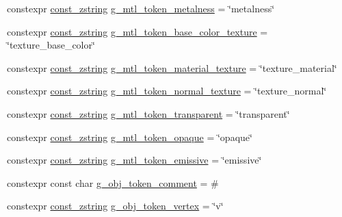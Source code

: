 \begin{DoxyCompactItemize}
\item 
constexpr \hyperlink{namespacemage_abfd9206dc607ceb5d13ec68bf075a5c0}{const\+\_\+zstring} \hyperlink{namespacemage_1_1rendering_1_1loader_a17bfd9071437318629c792d38ca71808}{g\+\_\+mtl\+\_\+token\+\_\+metalness} = \char`\"{}metalness\char`\"{}
\item 
constexpr \hyperlink{namespacemage_abfd9206dc607ceb5d13ec68bf075a5c0}{const\+\_\+zstring} \hyperlink{namespacemage_1_1rendering_1_1loader_aa3dfb00f93883473d1ff397f0079364e}{g\+\_\+mtl\+\_\+token\+\_\+base\+\_\+color\+\_\+texture} = \char`\"{}texture\+\_\+base\+\_\+color\char`\"{}
\item 
constexpr \hyperlink{namespacemage_abfd9206dc607ceb5d13ec68bf075a5c0}{const\+\_\+zstring} \hyperlink{namespacemage_1_1rendering_1_1loader_a0bd068f0f246c00b56412b1bd7f70ed4}{g\+\_\+mtl\+\_\+token\+\_\+material\+\_\+texture} = \char`\"{}texture\+\_\+material\char`\"{}
\item 
constexpr \hyperlink{namespacemage_abfd9206dc607ceb5d13ec68bf075a5c0}{const\+\_\+zstring} \hyperlink{namespacemage_1_1rendering_1_1loader_afa917f0393f16f0fec40ad5d85aa65f9}{g\+\_\+mtl\+\_\+token\+\_\+normal\+\_\+texture} = \char`\"{}texture\+\_\+normal\char`\"{}
\item 
constexpr \hyperlink{namespacemage_abfd9206dc607ceb5d13ec68bf075a5c0}{const\+\_\+zstring} \hyperlink{namespacemage_1_1rendering_1_1loader_a2e86bdf00ab5d9721684b02b575a9df7}{g\+\_\+mtl\+\_\+token\+\_\+transparent} = \char`\"{}transparent\char`\"{}
\item 
constexpr \hyperlink{namespacemage_abfd9206dc607ceb5d13ec68bf075a5c0}{const\+\_\+zstring} \hyperlink{namespacemage_1_1rendering_1_1loader_a6f5ffd9bd3336fb8589c59a322ca2b1e}{g\+\_\+mtl\+\_\+token\+\_\+opaque} = \char`\"{}opaque\char`\"{}
\item 
constexpr \hyperlink{namespacemage_abfd9206dc607ceb5d13ec68bf075a5c0}{const\+\_\+zstring} \hyperlink{namespacemage_1_1rendering_1_1loader_ae5dfb2d3e435ce7270ab74034bb372e4}{g\+\_\+mtl\+\_\+token\+\_\+emissive} = \char`\"{}emissive\char`\"{}
\item 
constexpr const char \hyperlink{namespacemage_1_1rendering_1_1loader_a28d2091ac0bc8a30979e417ca93adfb9}{g\+\_\+obj\+\_\+token\+\_\+comment} = \textquotesingle{}\#\textquotesingle{}
\item 
constexpr \hyperlink{namespacemage_abfd9206dc607ceb5d13ec68bf075a5c0}{const\+\_\+zstring} \hyperlink{namespacemage_1_1rendering_1_1loader_af514e04ff45fa5aeddcb1cfc24fb77b1}{g\+\_\+obj\+\_\+token\+\_\+vertex} = \char`\"{}v\char`\"{}

\end{DoxyCompactItemize}
